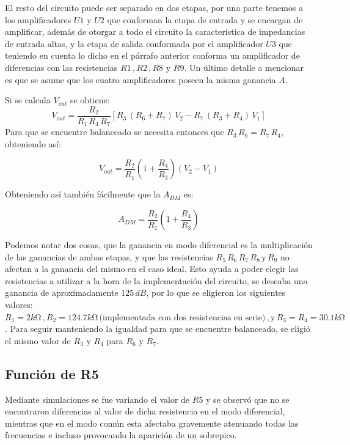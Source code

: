 	El resto del circuito puede ser separado en dos etapas, por una parte tenemos a los amplificadores $\mathit{U1}$ y $\mathit{U2}$ que conforman la etapa de entrada y se encargan de amplificar, además de otorgar a todo el circuito la característica de impedancias de entrada altas, y la etapa de salida conformada por el amplificador $\mathit{U3}$ que teniendo en cuenta lo dicho en el párrafo anterior conforma un amplificador de diferencias con las resistencias $R1 \, , R2 \, , R8$ y $R9$. Un último detalle a mencionar es que se asume que los cuatro amplificadores poseen la misma ganancia $A$.

	Si se calcula $V_{out}$ se obtiene:
\begin{equation}
V_{out} = \dfrac{R_2}{R_1 \, R_4 \, R_7} [R_3 \, (R_6 + R_7) \,V_2 - R_7 \, (R_3 + R_4) \,V_1]
\label{eq:Vout ideal}
\end{equation}
	Para que se encuentre balanceado se necesita entonces que $R_3 \, R_6 = R_7 \, R_4$, obteniendo así:

\begin{equation}
V_{out} = \dfrac{R_2}{R_1} \left( 1 + \dfrac{R_4}{R_3} \right) (V_2 - V_1)
\label{eq:Vout ideal balanceado}
\end{equation}

	Obteniendo así también fácilmente que la $A_{DM}$ es:
	
\begin{equation}
A_{DM} = \dfrac{R_2}{R_1} \left( 1 + \dfrac{R_4}{R_3} \right)
\label{eq:ADM caso ideal}
\end{equation}

	Podemos notar dos cosas, que la ganancia en modo diferencial es la multiplicación de las ganancias de ambas etapas, y que las resistencias $R_5 \, R_6 \, R_7 \, R_8 \, \text{y} \, R_9$ no afectan a la ganancia del mismo en el caso ideal.
	Esto ayuda a poder elegir las resistencias a utilizar a la hora de la implementación del circuito, se deseaba una ganancia de aproximadamente $125 \, dB$, por lo que se eligieron los siguientes valores: $R_1 = 2k \si{\ohm} \, , R_2 = 124.7k \si{\ohm} \, \text{(implementada con dos resistencias en serie)} \, , \text{y} \, R_3 = R_4 = 30.1k \si{\ohm}$. Para seguir manteniendo la igualdad para que se encuentre balanceado, se eligió el mismo valor de $R_3$ y $R_4$ para $R_6$ y $R_7$.

\subsection{Función de R5}
	Mediante simulaciones se fue variando el valor de $R5$ y se observó que no se encontraron diferencias al valor de dicha resistencia en el modo diferencial, mientras que en el modo común esta afectaba gravemente atenuando todas las frecuencias e incluso provocando la aparición de un sobrepico.
	
